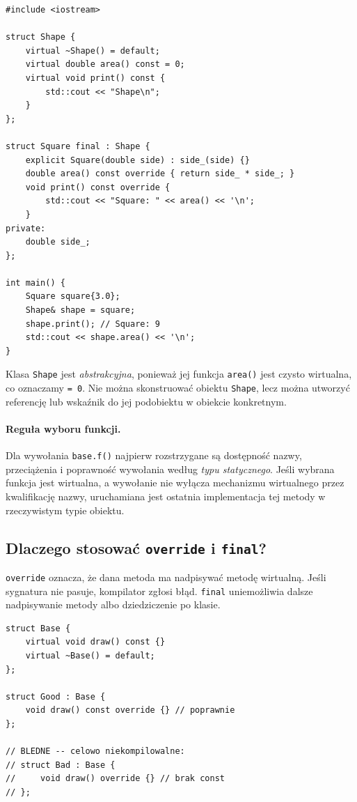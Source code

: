 \begin{lstlisting}[caption={Dynamiczne wiązanie wywołania przez virtual (C++11); kompletny program.}]
#include <iostream>

struct Shape {
    virtual ~Shape() = default;
    virtual double area() const = 0;
    virtual void print() const {
        std::cout << "Shape\n";
    }
};

struct Square final : Shape {
    explicit Square(double side) : side_(side) {}
    double area() const override { return side_ * side_; }
    void print() const override {
        std::cout << "Square: " << area() << '\n';
    }
private:
    double side_;
};

int main() {
    Square square{3.0};
    Shape& shape = square;
    shape.print(); // Square: 9
    std::cout << shape.area() << '\n';
}
\end{lstlisting}

Klasa \texttt{Shape} jest \emph{abstrakcyjna}, ponieważ jej funkcja
\texttt{area()} jest czysto wirtualna, co oznaczamy \texttt{= 0}.
Nie można skonstruować obiektu \texttt{Shape}, lecz można utworzyć
referencję lub wskaźnik do jej podobiektu w obiekcie konkretnym.

\paragraph{Reguła wyboru funkcji.}
Dla wywołania \texttt{base.f()} najpierw rozstrzygane są dostępność
nazwy, przeciążenia i poprawność wywołania według \emph{typu statycznego}.
Jeśli wybrana funkcja jest wirtualna, a wywołanie nie wyłącza mechanizmu
wirtualnego przez kwalifikację nazwy, uruchamiana jest ostatnia
implementacja tej metody w rzeczywistym typie obiektu.

\subsection{Dlaczego stosować \texttt{override} i \texttt{final}?}

\texttt{override} oznacza, że dana metoda ma nadpisywać metodę wirtualną.
Jeśli sygnatura nie pasuje, kompilator zgłosi błąd. \texttt{final}
uniemożliwia dalsze nadpisywanie metody albo dziedziczenie po klasie.

\begin{lstlisting}[caption={override wykrywa niezgodność sygnatur; fragment.}]
struct Base {
    virtual void draw() const {}
    virtual ~Base() = default;
};

struct Good : Base {
    void draw() const override {} // poprawnie
};

// BLEDNE -- celowo niekompilowalne:
// struct Bad : Base {
//     void draw() override {} // brak const
// };
\end{lstlisting}

